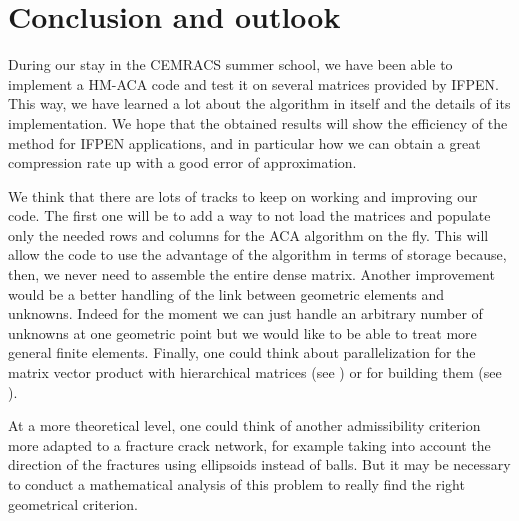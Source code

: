 

\section{Conclusion and outlook}

During our stay in the CEMRACS summer school, we have been able to implement a HM-ACA code and test it on several matrices provided by IFPEN. This way, we have learned a lot about the algorithm in itself and the details of its implementation. We hope that the obtained results will show the efficiency of the method for IFPEN applications, and in particular how we can obtain a great compression rate up with a good error of approximation.

\bigskip

We think that there are lots of tracks to keep on working and improving our code. The first one will be to add a way to not load the matrices and populate only the needed rows and columns for the ACA algorithm on the fly. This will allow the code to use the advantage of the algorithm in terms of storage because, then, we never need to assemble the entire dense matrix. Another improvement would be a better handling of the link between geometric elements and unknowns. Indeed for the moment we can just handle an arbitrary number of unknowns at one geometric point but we would like to be able to treat more general finite elements. Finally, one could think about parallelization for the matrix vector product with hierarchical matrices (see \cite[Section 3.1]{Bebendorf2008}) or for building them (see \cite[Section 3.4.6]{Bebendorf2008}).

At a more theoretical level, one could think of another admissibility criterion more adapted to a fracture crack network, for example taking into account the direction of the fractures using ellipsoids instead of balls. But it may be necessary to conduct a mathematical analysis of this problem to really find the right geometrical criterion.
